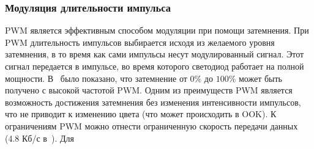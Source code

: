 \subsubsection{Модуляция длительности импульса}

PWM является эффективным способом модуляции при помощи затемнения. При PWM длительность импульсов выбирается исходя из желаемого уровня затемнения, в то время как сами импульсы несут модулированный сигнал. Этот сигнал передается в импульсе, во время которого светодиод работает на полной мощности. В~\cite{Sugiyama2007} было показано, что затемнение от $0\%$ до $100\%$ может быть получено с высокой частотой PWM. Одним из преимуществ PWM является возможность достижения затемнения без изменения интенсивности импульсов, что не приводит к изменению цвета (что может происходить в OOK). К ограничениям PWM можно отнести ограниченную скорость передачи данных (4.8 Кб/с в~\cite{Sugiyama2007}). Для 


